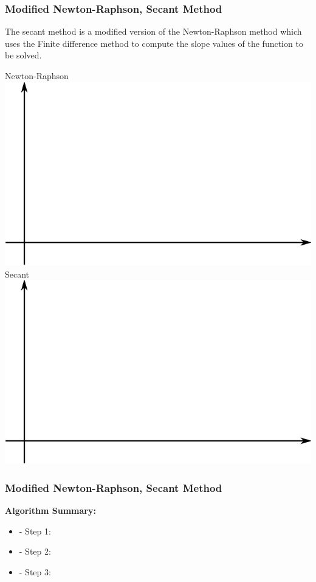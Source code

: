 \documentclass[fleqn]{beamer} %
\newcommand{\sectionIIsubsectionVtitle}{Modified Newton-Raphson, Secant Method}
\begin{document}
			\begin{frame}
				\frametitle{\sectionIIsubsectionVtitle}
				\bigskip

				The {\PR secant} method is a modified version of the Newton-Raphson method which uses the Finite difference method to compute the slope values of the function to be solved. \\

				\begin{multicols}{2}
				Newton-Raphson
				\includegraphics[scale=.22]{images/lecture4_fig1.png} 
				Secant
				\includegraphics[scale=.22]{images/lecture4_fig1.png}
				\end{multicols}

			
				\btVFill 
			\end{frame}

			\begin{frame}
				\frametitle{\sectionIIsubsectionVtitle}
				\bigskip

				\textbf{Algorithm Summary:}\vspace{3mm}\\
				\begin{itemize}
					\item - Step 1: \vspace{10mm}\\  
					
					\item - Step 2:  \vspace{10mm}\\ 
						
					\item - Step 3: 
						
				\end{itemize}
				\btVFill 
			\end{frame}
\end{document}
